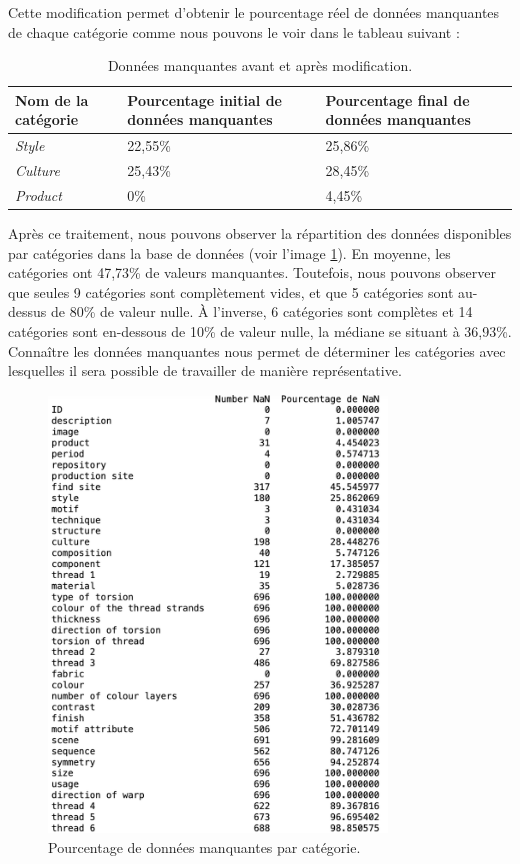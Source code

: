 Cette modification permet d'obtenir le pourcentage réel de données manquantes de chaque catégorie comme nous pouvons le voir dans le tableau suivant : \\

\begin{table}[!h]
    \begin{tabular}{|p{}|p{}|p{}|}
        \hline
        \textbf{Nom de la catégorie} & \textbf{Pourcentage initial de données manquantes} & \textbf{Pourcentage final de données manquantes } \\ [3ex]\hline
         \textit{Style} & 22,55\% & 25,86\%\\[1ex] \hline
           \textit{Culture}& 25,43\% & 28,45\% \\ [1ex]\hline
           \textit{Product}& 0\% & 4,45\% \\ [1ex]\hline
    \end{tabular}
    \caption{Données manquantes avant et après modification.}
    \label{tab:NaN}
\end{table}  

Après ce traitement, nous pouvons observer la répartition des données disponibles par catégories dans la base de données (voir l'image \ref{NaN}). En moyenne, les catégories ont 47,73\% de valeurs manquantes. Toutefois, nous pouvons observer que seules 9 catégories sont complètement vides, et que 5 catégories sont au-dessus de 80\% de valeur nulle. À l'inverse, 6 catégories sont complètes et 14 catégories sont en-dessous de 10\% de valeur nulle, la médiane se situant à 36,93\%. Connaître les données manquantes nous permet de déterminer les catégories avec lesquelles il sera possible de travailler de manière représentative.

\begin{figure}[!h]
	\begin{center}
		\includegraphics[width=9cm]{../images/NaN.png}
           	 \caption{Pourcentage de données manquantes par catégorie.}
           	 \label{NaN}
	 \end{center}
  \end{figure}


